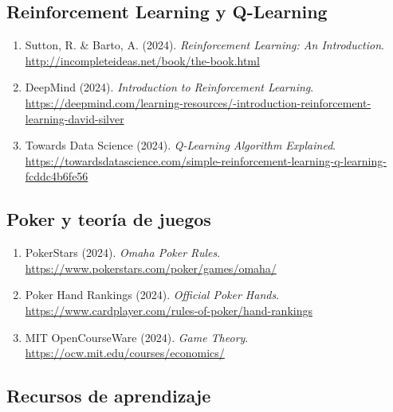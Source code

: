 \documentclass[12pt,a4paper]{article}
\begin{document}
\subsection{Reinforcement Learning y Q-Learning}

\begin{enumerate}[resume]
    \item Sutton, R. \& Barto, A. (2024). \textit{Reinforcement Learning: An Introduction}. \\
    \url{http://incompleteideas.net/book/the-book.html}
    
    \item DeepMind (2024). \textit{Introduction to Reinforcement Learning}. \\
    \url{https://deepmind.com/learning-resources/-introduction-reinforcement-learning-david-silver}
    
    \item Towards Data Science (2024). \textit{Q-Learning Algorithm Explained}. \\
    \url{https://towardsdatascience.com/simple-reinforcement-learning-q-learning-fcddc4b6fe56}
\end{enumerate}

\subsection{Poker y teoría de juegos}

\begin{enumerate}[resume]
    \item PokerStars (2024). \textit{Omaha Poker Rules}. \\
    \url{https://www.pokerstars.com/poker/games/omaha/}
    
    \item Poker Hand Rankings (2024). \textit{Official Poker Hands}. \\
    \url{https://www.cardplayer.com/rules-of-poker/hand-rankings}
    
    \item MIT OpenCourseWare (2024). \textit{Game Theory}. \\
    \url{https://ocw.mit.edu/courses/economics/}
\end{enumerate}

\subsection{Recursos de aprendizaje}
\end{document}
